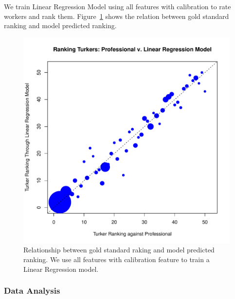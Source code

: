 \documentclass[11pt]{article}
\begin{document}
We train Linear Regression Model using all features with calibration to rate workers and rank them.
Figure~\ref{flrallcalirorder} shows the relation between gold standard ranking and model predicted ranking.

\begin{figure}[htbp]
  \centering
  \includegraphics[width=\linewidth]{AllFeatureWithCali/allcalirankinglrorder.pdf}
  \caption{Relationship between gold standard raking and model predicted ranking. We use all features with calibration feature to train a Linear Regression model. }
    \label{flrallcalirorder}
\end{figure}
\subsubsection{Data Analysis} \label{dataanaly}
\end{document}
